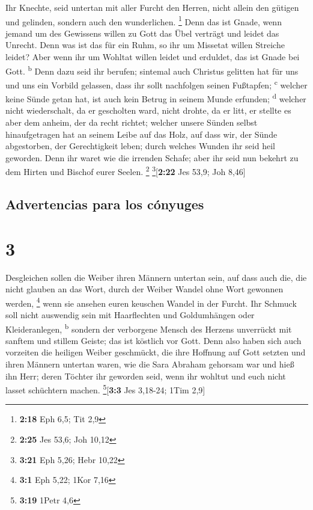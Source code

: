  Ihr Knechte, seid untertan mit aller Furcht den Herren,
nicht allein den gütigen und gelinden, sondern auch den wunderlichen.
\footnote{\textbf{2:18} Eph 6,5; Tit 2,9}  Denn das ist
Gnade, wenn jemand um des Gewissens willen zu Gott das Übel verträgt und
leidet das Unrecht.  Denn was ist das für ein Ruhm, so
ihr um Missetat willen Streiche leidet? Aber wenn ihr um Wohltat willen
leidet und erduldet, das ist Gnade bei Gott. \textsuperscript{b}
 Denn dazu seid ihr berufen; sintemal auch Christus
gelitten hat für uns und uns ein Vorbild gelassen, dass ihr sollt
nachfolgen seinen Fußtapfen; \textsuperscript{c}  welcher
keine Sünde getan hat, ist auch kein Betrug in seinem Munde erfunden;
\textsuperscript{d}  welcher nicht wiederschalt, da er
gescholten ward, nicht drohte, da er litt, er stellte es aber dem
anheim, der da recht richtet;  welcher unsere Sünden
selbst hinaufgetragen hat an seinem Leibe auf das Holz, auf dass wir,
der Sünde abgestorben, der Gerechtigkeit leben; durch welches Wunden ihr
seid heil geworden.  Denn ihr waret wie die irrenden
Schafe; aber ihr seid nun bekehrt zu dem Hirten und Bischof eurer
Seelen. \footnote{\textbf{2:25} Jes 53,6; Joh 10,12}
\footnote{\textbf{3:21} Eph 5,26; Hebr 10,22}{[}\textbf{2:22} Jes 53,9;
Joh 8,46{]}

\hypertarget{advertencias-para-los-cuxf3nyuges}{%
\subsection{Advertencias para los
cónyuges}\label{advertencias-para-los-cuxf3nyuges}}

\hypertarget{section-2}{%
\section{3}\label{section-2}}

 Desgleichen sollen die Weiber ihren Männern untertan
sein, auf dass auch die, die nicht glauben an das Wort, durch der Weiber
Wandel ohne Wort gewonnen werden, \footnote{\textbf{3:1} Eph 5,22; 1Kor
  7,16}  wenn sie ansehen euren keuschen Wandel in der
Furcht.  Ihr Schmuck soll nicht auswendig sein mit
Haarflechten und Goldumhängen oder Kleideranlegen, \textsuperscript{b}
 sondern der verborgene Mensch des Herzens unverrückt mit
sanftem und stillem Geiste; das ist köstlich vor Gott. 
Denn also haben sich auch vorzeiten die heiligen Weiber geschmückt, die
ihre Hoffnung auf Gott setzten und ihren Männern untertan waren,
 wie die Sara Abraham gehorsam war und hieß ihn Herr;
deren Töchter ihr geworden seid, wenn ihr wohltut und euch nicht lasset
schüchtern machen. \footnote{\textbf{3:19} 1Petr 4,6}{[}\textbf{3:3} Jes
3,18-24; 1Tim 2,9{]}

